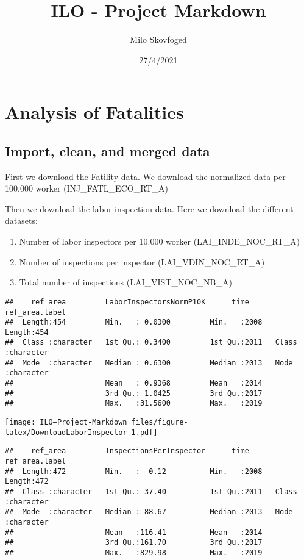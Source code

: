 \documentclass[
]{article}
\title{ILO - Project Markdown}
\author{Milo Skovfoged}
\date{27/4/2021}
\providecommand{\tightlist}{%
  \setlength{\itemsep}{0pt}\setlength{\parskip}{0pt}}
\begin{document}
\maketitle

\hypertarget{analysis-of-fatalities}{%
\section{Analysis of Fatalities}\label{analysis-of-fatalities}}

\hypertarget{import-clean-and-merged-data}{%
\subsection{Import, clean, and merged
data}\label{import-clean-and-merged-data}}

First we download the Fatility data. We download the normalized data per
100.000 worker (INJ\_FATL\_ECO\_RT\_A)

Then we download the labor inspection data. Here we download the
different datasets:

\begin{enumerate}
\def\labelenumi{\arabic{enumi}.}
\tightlist
\item
  Number of labor inspectors per 10.000 worker (LAI\_INDE\_NOC\_RT\_A)
\item
  Number of inspections per inspector (LAI\_VDIN\_NOC\_RT\_A)
\item
  Total number of inspections (LAI\_VIST\_NOC\_NB\_A)
\end{enumerate}

\begin{verbatim}
##    ref_area         LaborInspectorsNormP10K      time      ref_area.label    
##  Length:454         Min.   : 0.0300         Min.   :2008   Length:454        
##  Class :character   1st Qu.: 0.3400         1st Qu.:2011   Class :character  
##  Mode  :character   Median : 0.6300         Median :2013   Mode  :character  
##                     Mean   : 0.9368         Mean   :2014                     
##                     3rd Qu.: 1.0425         3rd Qu.:2017                     
##                     Max.   :31.5600         Max.   :2019
\end{verbatim}

\texttt{[image: ILO---Project-Markdown\_files/figure-latex/DownloadLaborInspector-1.pdf]}

\begin{verbatim}
##    ref_area         InspectionsPerInspector      time      ref_area.label    
##  Length:472         Min.   :  0.12          Min.   :2008   Length:472        
##  Class :character   1st Qu.: 37.40          1st Qu.:2011   Class :character  
##  Mode  :character   Median : 88.67          Median :2013   Mode  :character  
##                     Mean   :116.41          Mean   :2014                     
##                     3rd Qu.:161.70          3rd Qu.:2017                     
##                     Max.   :829.98          Max.   :2019
\end{verbatim}
\end{document}

